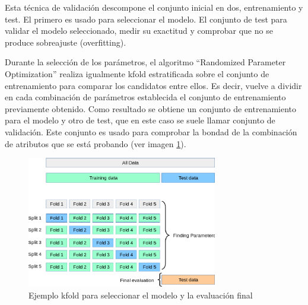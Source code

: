 Esta técnica de validación descompone el conjunto inicial en dos, entrenamiento y test. El primero es usado para seleccionar el modelo. El conjunto de test para validar el modelo seleccionado, medir su exactitud y comprobar que no se produce sobreajuste (overfitting).

Durante la selección de los parámetros, el algoritmo ``Randomized Parameter Optimization'' realiza igualmente \gls{kfold}  estratificada sobre el conjunto de entrenamiento para comparar los candidatos entre ellos. Es decir, vuelve a dividir en cada combinación de parámetros establecida el conjunto de entrenamiento previamente obtenido. Como resultado se obtiene un conjunto de entrenamiento para el modelo y otro de test, que en este caso se suele llamar conjunto de validación. Este conjunto es usado para comprobar la bondad de la combinación de atributos que se está probando (ver imagen \ref{figure:kfold}).

\begin{figure}[H]
\centering
\includegraphics[width=0.74\textwidth]{figs/experimentos/kfold.png}
\caption{Ejemplo \gls{kfold} para seleccionar el modelo y la evaluación final \cite{GitHubCompleto}}
\label{figure:kfold}
\end{figure}
